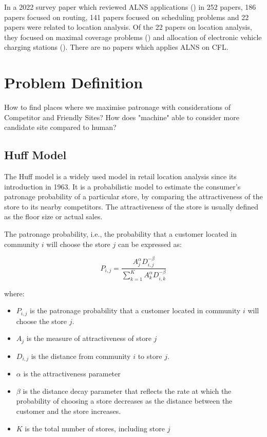 \documentclass{ecai}
\begin{document}
In a 2022 survey paper which reviewed ALNS applications (\cite{mara2022survey}) in 252 papers, 186 papers focused on routing, 141 papers focused on scheduling problems and 22 papers were related to location analysis. Of the 22 papers on location analysis, they focused on maximal coverage problems (\cite{pereira2015hybrid}) and allocation of electronic vehicle charging stations (\cite{guo2018battery}). There are no papers which applies ALNS on CFL.

\section{Problem Definition}
How to find places where we maximise patronage with considerations of Competitor and Friendly Sites?
How does "machine" able to consider more candidate site compared to human?

\subsection{Huff Model}

    The Huff model \citet{huff1963probabilistic} is a widely used model in retail location analysis since its introduction in 1963. It is a probabilistic model to estimate the consumer's patronage probability of a particular store, by comparing the attractiveness of the store to its nearby competitors. The attractiveness of the store is usually defined as the floor size or actual sales.  

The patronage probability, i.e., the probability that a customer located in community $i$ will choose the store $j$ can be expressed as:

\begin{equation}
P_{i,j} = \frac{A_j^{\alpha}D_{i,j}^{-\beta}}{\sum_{k=1}^{K} A_k^{\alpha}D_{i,k}^{-\beta}}
\end{equation}

where:

\begin{itemize}
    \item $P_{i,j}$ is the patronage probability that a customer located in community $i$ will choose the store $j$.
    \item $A_j$ is the measure of attractiveness of store $j$
    \item $D_{i,j}$ is the distance from community $i$ to store $j$.
    \item $\alpha$ is the attractiveness parameter
    \item $\beta$ is the distance decay parameter that reflects the rate at which the probability of choosing a store decreases as the distance between the customer and the store increases.
    \item $K$ is the total number of stores, including store $j$
\end{itemize}
\end{document}
